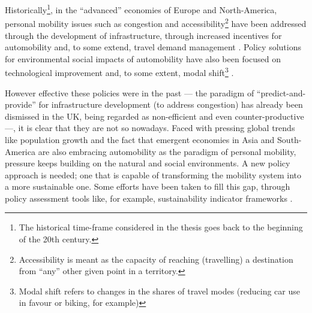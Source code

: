 Historically\footnote{The historical time-frame considered in the thesis goes back to the beginning of the 20th century.}, in the ``advanced'' economies of Europe and North-America, personal mobility issues such as congestion and accessibility\footnote{Accessibility is meant as the capacity of reaching (travelling) a destination from ``any'' other given point in a territory.} have been addressed through the development of infrastructure, through increased incentives for automobility and, to some extend, travel demand management \parencite{lyons2012_VisionsFutureNeed}. Policy solutions for environmental social impacts of automobility have also been focused on technological improvement and, to some extent, modal shift\footnote{Modal shift refers to changes in the shares of travel modes (reducing car use in favour or biking, for example)} \parencite{koehler2009_transitionsmodelsustainable}.

However effective these policies were in the past --- the paradigm of ``predict-and-provide'' for infrastructure development (to address congestion) has already been dismissed in the UK, being regarded as non-efficient and even counter-productive \parencite{goodwin2012_ProvidingRoadCapacity} ---, it is clear that they are not so nowadays. Faced with pressing global trends like population growth and the fact that emergent economies in Asia and South-America are also embracing automobility as the paradigm of personal mobility, pressure keeps building on the natural and social environments. A new policy approach is needed; one that is capable of transforming the mobility system into a more sustainable one. Some efforts have been taken to fill this gap, through policy assessment tools like, for example, sustainability indicator frameworks \parencite{castillo2010_ELASTICmethodological,haghshenas2012_Urbansustainabletransportation,litman2007_DevelopingIndicatorsComprehensive,shiau2013_Developingindicatorsystem}.

